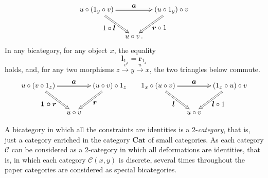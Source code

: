 \documentclass[]{amsart}
\begin{document}
\begin{equation}\label{tri1}\xymatrix@C=10pt{u\circ (1_y\circ v)\ar@2{->}[rr]^{\textstyle \boldsymbol{a}}\ar@2{->}[rd]_{\textstyle 1 \circ \boldsymbol{l}}&&(u\circ 1_y)\circ v
\ar@2{->}[ld]^{\textstyle \boldsymbol{r}\circ 1}\\&u\circ v\,.&}
\end{equation}
In any bicategory, for any object $x$, the equality
\begin{equation}\label{rl}\boldsymbol{l}_{1_x}=\boldsymbol{r}_{1_x}\end{equation}
holds, and, for any two morphisms $z\overset{v}\to y\overset{u}\to x$, the two triangles below
commute.
\begin{equation}\label{tri23}\xymatrix@C=10pt{u\circ (v\circ 1_z)\ar@2{->}[rr]^{\textstyle \boldsymbol{a}}\ar@2{->}[rd]_{\textstyle \boldsymbol{1\circ r}}&&(u\circ v)\circ 1_z
\ar@2{->}[ld]^{\textstyle \boldsymbol{r}}\\&u\circ v&}\hspace{0.5cm} \xymatrix@C=10pt{1_x\circ (u
\circ v)\ar@2{->}[rr]^{\textstyle \boldsymbol{a}}\ar@2{->}[rd]_{\textstyle \boldsymbol{l}}&&(1_x
\circ u)\circ v \ar@2{->}[ld]^{\textstyle \boldsymbol{l}\circ 1}\\&u\circ v&}
\end{equation}

A bicategory in which all the constraints are identities is a 2-{\em category}, that is, just a
category enriched in the category ${\ensuremath{\mathbf{Cat}}}$ of small categories. As each category ${\ensuremath{\mathcal{C}}}$ can be
considered as a 2-category in which all deformations are identities, that is, in which each
category ${\ensuremath{\mathcal{C}}}(x,y)$ is discrete, several times throughout the paper categories are considered as
special bicategories.
\end{document}
